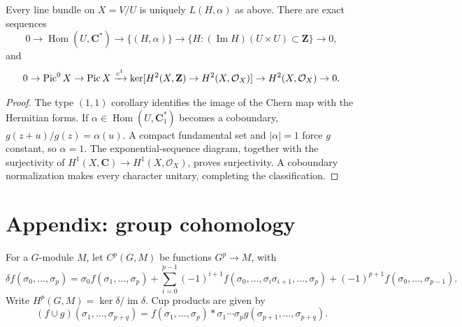 \begin{theorem}
\label{mumford-thm-appell-humbert}
Every line bundle on $X=V/U$ is uniquely $L(H,\alpha)$ as above. There are
exact sequences
\[
0\to\operatorname{Hom}(U,\mathbf C^*)\to\{(H,\alpha)\}\to
\{H:(\operatorname{Im}H)(U\times U)\subset\mathbf Z\}\to0,
\]
and
\[
0\to\operatorname{Pic}^0X\to\operatorname{Pic} X\xrightarrow{c^1}
\ker[H^2(X,\mathbf Z)\to H^2(X,\mathcal O_X)]\to H^2(X,\mathcal O_X)\to0.
\]
\end{theorem}
\begin{proof}
The type $(1,1)$ corollary identifies the image of the Chern map with the
Hermitian forms. If $\alpha\in\operatorname{Hom}(U,\mathbf C_1^*)$ becomes a
coboundary, $g(z+u)/g(z)=\alpha(u)$. A compact fundamental set and
$|\alpha|=1$ force $g$ constant, so $\alpha=1$. The exponential-sequence
diagram, together with the surjectivity of $H^1(X,\mathbf C)\to
H^1(X,\mathcal O_X)$, proves surjectivity. A coboundary normalization makes
every character unitary, completing the classification.
\end{proof}

\section{Appendix: group cohomology}
\label{mumford-source-group-cohomology}

For a $G$-module $M$, let $C^p(G,M)$ be functions $G^p\to M$, with
\[
\delta f(\sigma_0,\ldots,\sigma_p)=\sigma_0f(\sigma_1,\ldots,\sigma_p)
 +\sum_{i=0}^{p-1}(-1)^{i+1}f(\sigma_0,\ldots,\sigma_i\sigma_{i+1},\ldots,\sigma_p)
 +(-1)^{p+1}f(\sigma_0,\ldots,\sigma_{p-1}).
\]
Write $H^p(G,M)=\ker\delta/\operatorname{im}\delta$. Cup products are given
by
\[
 (f\cup g)(\sigma_1,\ldots,\sigma_{p+q})=
 f(\sigma_1,\ldots,\sigma_p)*\sigma_1\cdots\sigma_p
 g(\sigma_{p+1},\ldots,\sigma_{p+q}).
\]

